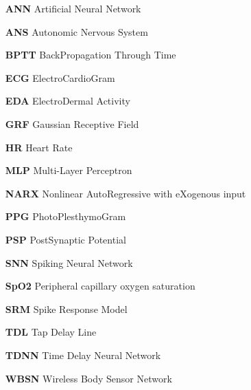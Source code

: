  
\begin{itemize} 

\item[\textbf{ANN}] Artificial Neural Network
\item[\textbf{ANS}] Autonomic Nervous System
\item[\textbf{BPTT}] BackPropagation Through Time
\item[\textbf{ECG}] ElectroCardioGram
\item[\textbf{EDA}] ElectroDermal Activity
\item[\textbf{GRF}] Gaussian Receptive Field
\item[\textbf{HR}] Heart Rate
\item[\textbf{MLP}] Multi-Layer Perceptron
\item[\textbf{NARX}] Nonlinear AutoRegressive with eXogenous input
\item[\textbf{PPG}] PhotoPlesthymoGram
\item[\textbf{PSP}] PostSynaptic Potential
\item[\textbf{SNN}] Spiking Neural Network
\item[\textbf{SpO2}] Peripheral capillary oxygen saturation
\item[\textbf{SRM}] Spike Response Model
\item[\textbf{TDL}] Tap Delay Line
\item[\textbf{TDNN}] Time Delay Neural Network
\item[\textbf{WBSN}] Wireless Body Sensor Network

\end{itemize} 

